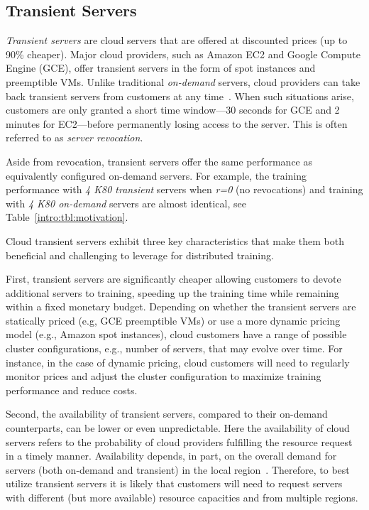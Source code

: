 \subsection{Transient Servers}
\label{subsec:transient}

\emph{Transient servers} are cloud servers that are offered at discounted
prices (up to 90\% cheaper). Major cloud providers, such as Amazon EC2 and
Google Compute Engine (GCE), offer transient servers in the form
of spot instances and preemptible VMs. Unlike traditional \emph{on-demand}
servers, cloud providers can take back transient servers from customers at any
time~\cite{ec2_spot,gce_preemptible}. When such situations arise, customers are
only granted a short time window---30 seconds for GCE and 2 minutes for
EC2---before permanently losing access to the server. This is often referred to
as \emph{server revocation}.

Aside from revocation, transient servers offer the same performance as
equivalently configured on-demand servers. For example, the training
performance with \emph{4 K80 transient} servers when \emph{r=0} (no
revocations) and training with \emph{4 K80 on-demand} servers are almost
identical, see Table~\ref{intro:tbl:motivation}.
  

Cloud transient servers exhibit three key characteristics that make them both
beneficial and challenging to leverage for distributed training. 

First, transient servers are significantly cheaper allowing customers to devote
additional servers to training, speeding up the training time while remaining
within a fixed monetary budget.  Depending on whether the transient servers are
statically priced (e.g, GCE preemptible VMs) or use a more dynamic pricing
model (e.g., Amazon spot instances), cloud customers have a range of possible
cluster configurations, e.g., number of servers, that may evolve over time. For instance, in the case of
dynamic pricing, cloud customers will need to regularly monitor prices and
adjust the cluster configuration to maximize training performance and reduce
costs.


Second, the availability of transient servers, compared to their on-demand
counterparts, can be lower or even unpredictable.  Here the availability of
cloud servers refers to the probability of cloud providers fulfilling the
resource request in a timely manner. 
Availability depends, in part, on the overall demand for servers (both
on-demand and transient) in the local region~\cite{spotlight}.  Therefore, to
best utilize transient servers it is likely that customers will need to request
servers with different (but more available) resource capacities and from multiple regions.

